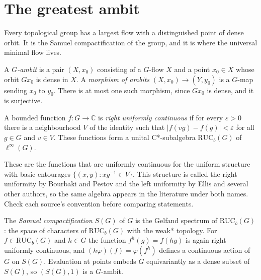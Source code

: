 \section{The greatest ambit}\label{sec:ambit}

Every topological group has a largest flow with a distinguished point of dense
orbit. It is the Samuel compactification of the group, and it is where the
universal minimal flow lives.

\begin{definition}[Ambit]\label{def:ambit}
A \emph{$G$-ambit} is a pair $(X,x_0)$ consisting of a $G$-flow $X$ and a point
$x_0\in X$ whose orbit $Gx_0$ is dense in $X$. A \emph{morphism of ambits}
$(X,x_0)\to(Y,y_0)$ is a $G$-map sending $x_0$ to $y_0$. There is at most one
such morphism, since $Gx_0$ is dense, and it is surjective.
\end{definition}

\begin{definition}\label{def:ruc}
A bounded function $f\colon G\to\mathbb{C}$ is \emph{right uniformly
continuous} if for every $\varepsilon>0$ there is a neighbourhood $V$ of the
identity such that $|f(vg)-f(g)|<\varepsilon$ for all $g\in G$ and $v\in V$.
These functions form a unital C*-subalgebra $\mathrm{RUC}_b(G)$ of
$\ell^\infty(G)$.
\end{definition}

\begin{remark}[Conventions]\label{rem:ruc-conventions}
These are the functions that are uniformly continuous for the uniform
structure with basic entourages $\{(x,y) : xy^{-1}\in V\}$. This structure is
called the right uniformity by Bourbaki and Pestov and the left uniformity by
Ellis and several other authors, so the same algebra appears in the literature
under both names. Check each source's convention before comparing statements.
\end{remark}

\begin{definition}\label{def:samuel}
The \emph{Samuel compactification} $S(G)$ of $G$ is the Gelfand spectrum of
$\mathrm{RUC}_b(G)$: the space of characters of $\mathrm{RUC}_b(G)$ with the
weak* topology. For $f\in\mathrm{RUC}_b(G)$ and $h\in G$ the function
$f^h(g)=f(hg)$ is again right uniformly continuous, and
$(h\varphi)(f)=\varphi(f^h)$ defines a continuous action of $G$ on $S(G)$.
Evaluation at points embeds $G$ equivariantly as a dense subset of $S(G)$, so
$(S(G),1)$ is a $G$-ambit.
\end{definition}

